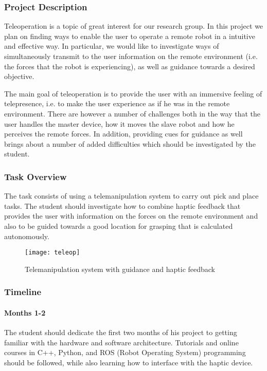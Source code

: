 
\subsubsection{Project Description}

Teleoperation is a topic of great interest for our research group.
In this project we plan on finding ways to enable the user to operate a remote robot in a intuitive and effective way.
In particular, we would like to investigate ways of simultaneously transmit to the user information on the remote environment (i.e. the forces that the robot is experiencing), as well as guidance towards a desired objective.

The main goal of teleoperation is to provide the user with an immersive feeling of telepresence, i.e. to make the user experience as if he was in the remote environment.
There are however a number of challenges both in the way that the user handles the master device, how it moves the slave robot and how he perceives the remote forces.
In addition, providing cues for guidance as well brings about a number of added difficulties which should be investigated by the student.

\subsubsection{Task Overview}

The task consists of using a telemanipulation system to carry out pick and place tasks. 
The student should investigate how to combine haptic feedback that provides the user with information on the forces on the remote environment and also to be guided towards a good location for grasping that is calculated autonomously.



\begin{figure}[htb!]
	\centering
	\texttt{[image: teleop]}
	\caption{Telemanipulation system with guidance and haptic feedback}
\end{figure}


\subsubsection{Timeline}
\paragraph{Months 1-2}
The student should dedicate the first two months of his project to getting familiar with the hardware and software architecture.
Tutorials and online courses in C++, Python, and ROS (Robot Operating System) programming should be followed, while also learning how to interface with the haptic device.
